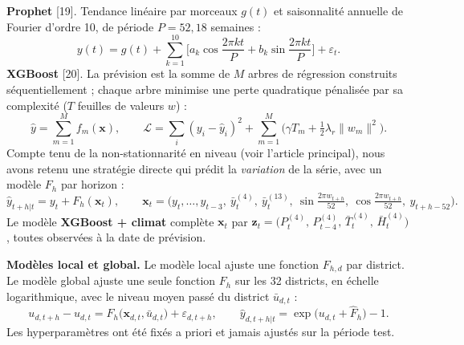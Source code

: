 \documentclass[11pt]{article}
\begin{document}
\textbf{Prophet} [19]. Tendance linéaire par morceaux $g(t)$ et saisonnalité annuelle de Fourier d'ordre 10, de période $P=52{,}18$ semaines :
\begin{equation}
y(t)=g(t)+\sum_{k=1}^{10}\Big[a_k\cos\frac{2\pi kt}{P}+b_k\sin\frac{2\pi kt}{P}\Big]+\varepsilon_t .
\label{eq:prophet}
\end{equation}
\textbf{XGBoost} [20]. La prévision est la somme de $M$ arbres de régression construits séquentiellement ; chaque arbre minimise une perte quadratique pénalisée par sa complexité ($T$ feuilles de valeurs $w$) :
\begin{equation}
\hat{y}=\sum_{m=1}^{M}f_m(\mathbf{x}),\qquad \mathcal{L}=\sum_i(y_i-\hat{y}_i)^2+\sum_{m=1}^{M}\Big(\gamma T_m+\tfrac{1}{2}\lambda_r\lVert w_m\rVert^2\Big).
\label{eq:xgb}
\end{equation}
Compte tenu de la non-stationnarité en niveau (voir l'article principal), nous avons retenu une stratégie directe qui prédit la \textit{variation} de la série, avec un modèle $F_h$ par horizon :
\begin{equation}
\hat{y}_{t+h|t}=y_t+F_h(\mathbf{x}_t),\qquad \mathbf{x}_t=\Big(y_t,\dots,y_{t-3},\ \bar{y}^{(4)}_t,\ \bar{y}^{(13)}_t,\ \sin\tfrac{2\pi w_{t+h}}{52},\ \cos\tfrac{2\pi w_{t+h}}{52},\ y_{t+h-52}\Big).
\label{eq:direct}
\end{equation}
Le modèle \textbf{XGBoost + climat} complète $\mathbf{x}_t$ par $\mathbf{z}_t=\big(P^{(4)}_t,\,P^{(4)}_{t-4},\,\bar{T}^{(4)}_t,\,\bar{H}^{(4)}_t\big)$, toutes observées à la date de prévision.

\textbf{Modèles local et global.} Le modèle local ajuste une fonction $F_{h,d}$ par district. Le modèle global ajuste une seule fonction $F_h$ sur les 32 districts, en échelle logarithmique, avec le niveau moyen passé du district $\bar{u}_{d,t}$ :
\begin{equation}
u_{d,t+h}-u_{d,t}=F_h\big(\mathbf{x}_{d,t},\bar{u}_{d,t}\big)+\varepsilon_{d,t+h},\qquad \hat{y}_{d,t+h|t}=\exp\big(u_{d,t}+\hat{F}_h\big)-1 .
\label{eq:global}
\end{equation}
Les hyperparamètres ont été fixés a priori et jamais ajustés sur la période test.
\end{document}
